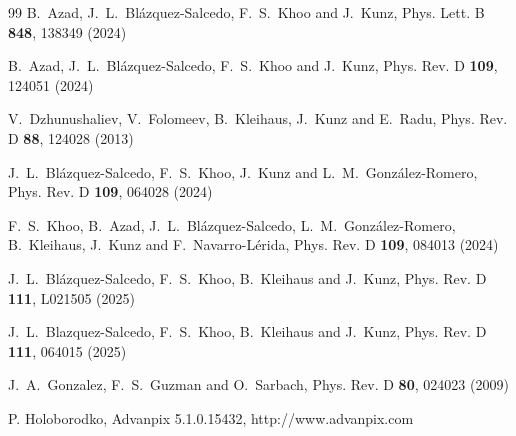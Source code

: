 \documentclass[floats,floatfix,showpacs,amssymb,prd,superscriptaddress,nofootinbib,nolongbibliography,reprint]{revtex4-2}
\begin{document}
\begin{thebibliography}{99}
B.~Azad, J.~L.~Bl\'azquez-Salcedo, F.~S.~Khoo and J.~Kunz,
Phys. Lett. B \textbf{848}, 138349 (2024)

B.~Azad, J.~L.~Bl{\'a}zquez-Salcedo, F.~S.~Khoo and J.~Kunz,
Phys. Rev. D \textbf{109}, 124051 (2024)

V.~Dzhunushaliev, V.~Folomeev, B.~Kleihaus, J.~Kunz and E.~Radu,
Phys. Rev. D \textbf{88}, 124028 (2013)

J.~L.~Bl\'azquez-Salcedo, F.~S.~Khoo, J.~Kunz and L.~M.~Gonz\'alez-Romero,
Phys. Rev. D \textbf{109}, 064028 (2024)

F.~S.~Khoo, B.~Azad, J.~L.~Bl\'azquez-Salcedo, L.~M.~Gonz\'alez-Romero, B.~Kleihaus, J.~Kunz and F.~Navarro-L\'erida,
Phys. Rev. D \textbf{109}, 084013 (2024)

J.~L.~Bl{\'a}zquez-Salcedo, F.~S.~Khoo, B.~Kleihaus and J.~Kunz,
Phys. Rev. D \textbf{111}, L021505 (2025)

J.~L.~Blazquez-Salcedo, F.~S.~Khoo, B.~Kleihaus and J.~Kunz,
Phys. Rev. D \textbf{111}, 064015 (2025)

J.~A.~Gonzalez, F.~S.~Guzman and O.~Sarbach,
Phys. Rev. D \textbf{80}, 024023 (2009)


P. Holoborodko, 
Advanpix 5.1.0.15432,
http://www.advanpix.com





\end{thebibliography}
\end{document}
